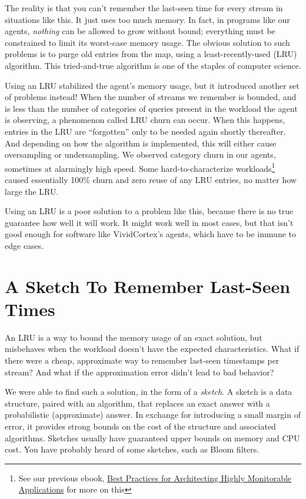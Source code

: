 \documentclass{vivid_layout}
\begin{document}
The reality is that you can't remember the last-seen time for every stream in
situations like this. It just uses too much memory. In fact, in programs like
our agents, \emph{nothing} can be allowed to grow without bound; everything must
be constrained to limit its worst-case memory usage.  The obvious solution to
such problems is to purge old entries from the map, using a least-recently-used
(LRU) algorithm. This tried-and-true algorithm is one of the staples of computer
science.

Using an LRU stabilized the agent's memory usage, but it introduced another set
of problems instead! When the number of streams we remember is bounded, and is
less than the number of categories of queries present in the workload the agent
is observing, a phenomenon called LRU churn can occur. When this happens,
entries in the LRU are ``forgotten'' only to be needed again shortly thereafter.
And depending on how the algorithm is implemented, this will either cause
oversampling or undersampling. We observed category churn in our agents,
sometimes at alarmingly high speed. Some hard-to-characterize
workloads\footnote{See our previous ebook,
\href{https://www.vividcortex.com/resources/architecting-highly-monitorable-apps}{Best
Practices for Architecting Highly Monitorable Applications} for more on this}
caused essentially 100\% churn and zero reuse of any LRU entries, no matter how
large the LRU.

Using an LRU is a poor solution to a problem like this, because there is no true
guarantee how well it will work. It might work well in most cases, but that
isn't good enough for software like VividCortex's agents, which have to be
immune to edge cases.

\section{A Sketch To Remember Last-Seen Times}

An LRU is a way to bound the memory usage of an exact solution, but misbehaves
when the workload doesn't have the expected characteristics. What if there were
a cheap, approximate way to remember last-seen timestamps per stream? And what if the
approximation error didn't lead to bad behavior?

We were able to find such a solution, in the form of a \emph{sketch}. A sketch
is a data structure, paired with an algorithm, that replaces an exact answer
with a probabilistic (approximate) answer. In exchange for introducing a small
margin of error, it provides strong bounds on the cost of the structure and
associated algorithms. Sketches usually have guaranteed upper bounds on memory
and CPU cost. You have probably heard of some sketches, such as Bloom filters.
\end{document}
